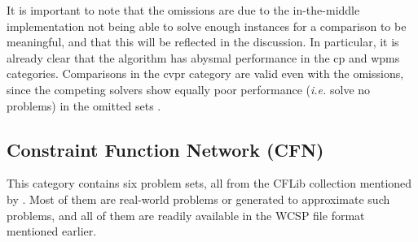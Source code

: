 It is important to note that the omissions are due to the in-the-middle implementation not being able to solve enough instances for a comparison to be meaningful, and that this will be reflected in the discussion.
In particular, it is already clear that the algorithm has abysmal performance in the \gls{cp} and \gls{wpms} categories.
Comparisons in the \gls{cvpr} category are valid even with the omissions, since the competing solvers show equally poor performance (\emph{i.e.} solve no problems) in the omitted sets \textcite[\pno~9]{deGivry14}.

\subsection{Constraint Function Network (CFN)}
This category contains six problem sets, all from the CFLib collection mentioned by \textcite[\pno~3]{deGivry14}.
Most of them are real-world problems or generated to approximate such problems, and all of them are readily available in the \textsc{WCSP} file format mentioned earlier.


